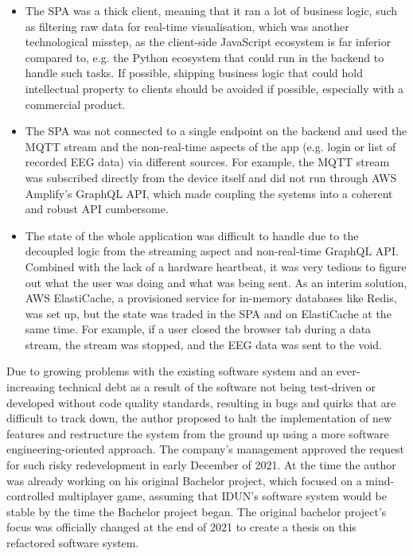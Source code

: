 \begin{itemize}
\item The SPA was a thick client, meaning that it ran a lot of business logic, such as filtering raw data for real-time visualisation, which was another technological misstep, as the client-side JavaScript ecosystem is far inferior compared to, e.g. the Python ecosystem that could run in the backend to handle such tasks. If possible, shipping business logic that could hold intellectual property to clients should be avoided if possible, especially with a commercial product.
\item The SPA was not connected to a single endpoint on the backend and used the MQTT stream and the non-real-time aspects of the app (e.g. login or list of recorded EEG data) via different sources. For example, the MQTT stream was subscribed directly from the device itself and did not run through AWS Amplify's GraphQL API, which made coupling the systems into a coherent and robust API cumbersome.
\item The state of the whole application was difficult to handle due to the decoupled logic from the streaming aspect and non-real-time GraphQL API. Combined with the lack of a hardware heartbeat, it was very tedious to figure out what the user was doing and what was being sent. As an interim solution, AWS ElastiCache, a provisioned service for in-memory databases like Redis, was set up, but the state was traded in the SPA and on ElastiCache at the same time. For example, if a user closed the browser tab during a data stream, the stream was stopped, and the EEG data was sent to the void.
\end{itemize}

Due to growing problems with the existing software system and an ever-increasing technical debt as a result of the software not being test-driven or developed without code quality standards, resulting in bugs and quirks that are difficult to track down, the author proposed to halt the implementation of new features and restructure the system from the ground up using a more software engineering-oriented approach. The company's management approved the request for such risky redevelopment in early December of 2021. At the time the author was already working on his original Bachelor project, which focused on a mind-controlled multiplayer game, assuming that IDUN's software system would be stable by the time the Bachelor project began. The original bachelor project's focus was officially changed at the end of 2021 to create a thesis on this refactored software system.

